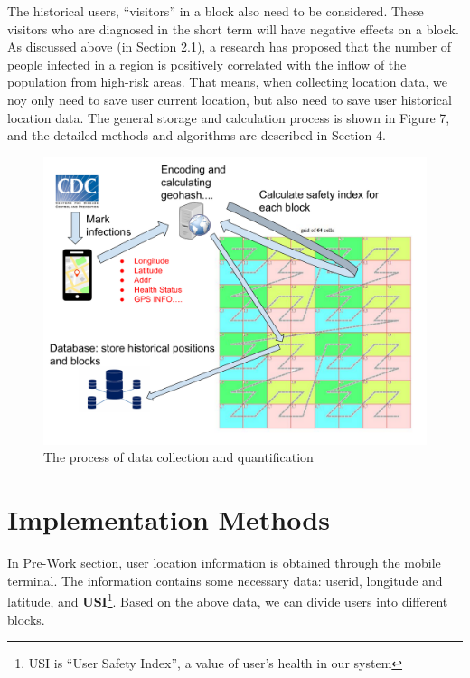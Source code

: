 \documentclass[sigplan,screen]{acmart}
\begin{document}
The historical users, ``visitors'' in a block also need to be considered.
These visitors who are diagnosed in the short term will have negative effects on a block.
As discussed above (in Section 2.1), a research has proposed that the number of people infected in a region is positively correlated with the inflow of the population from high-risk areas.
That means, when collecting location data, we noy only need to save user current location, but also need to save user historical location data.
The general storage and calculation process is shown in Figure 7, and the detailed methods and algorithms are described in Section 4.
\begin{figure}[htb]
	\centering\includegraphics[width=\linewidth]{process.pdf}
	\caption{The process of data collection and quantification}
\end{figure}
\section{Implementation Methods}
In Pre-Work section, user location information is obtained through the mobile terminal.
The information contains some necessary data: userid, longitude and latitude, and \textbf{USI}\footnote{USI is ``User Safety Index'', a value of user's health in our system}.
Based on the above data, we can divide users into different blocks.
\end{document}
